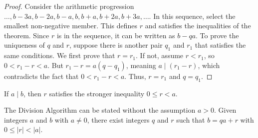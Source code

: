 \documentclass[11pt]{article}
\begin{document}
\begin{proof}
    Consider the arithmetic progression $\ldots, b - 3a, b - 2a, b - a, b, b + a, b + 2a, b + 3a, \ldots$. In this sequence, select the smallest non-negative member. This defines $r$ and satisfies the inequalities of the theorem. Since $r$ is in the sequence, it can be written as $b - qa$. To prove the uniqueness of $q$ and $r$, suppose there is another pair $q_1$ and $r_1$ that satisfies the same conditions. We first prove that $r = r_1$. If not, assume $r < r_1$, so $0 < r_1 - r < a$. But $r_1 - r = a(q - q_1)$, meaning $a \mid (r_1 - r)$, which contradicts the fact that $0 < r_1 - r < a$. Thus, $r = r_1$ and $q = q_1$.
\end{proof}

\begin{fact}
    If $a \mid b$, then $r$ satisfies the stronger inequality $0 \leq r < a$.
\end{fact}

\begin{fact}
    The Division Algorithm can be stated without the assumption $a > 0$. Given integers $a$ and $b$ with $a \neq 0$, there exist integers $q$ and $r$ such that $b = qa + r$ with $0 \leq |r| < |a|$.
\end{fact}
\end{document}

